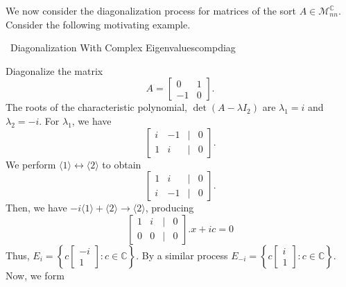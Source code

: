         We now consider the diagonalization process for matrices of the sort \(A\in\mathcal{M}_{nn}^\mathbb{C}\). Consider the following motivating example.
        \begin{example}{\Difficulty\,\Difficulty\,\,Diagonalization With Complex Eigenvalues}{compdiag}

            Diagonalize the matrix
            \begin{equation*}
                A=\begin{bmatrix}
                    0 & 1 \\
                     -1 & 0
                \end{bmatrix}.
            \end{equation*}
            The roots of the characteristic polynomial, \(\det(A-\lambda I_2)\) are \(\lambda_1=i\) and \(\lambda_2=-i\). For \(\lambda_1\), we have
            \begin{equation*}
                \begin{bmatrix}
                    i & -1 & | & 0 \\
                    1 & i & | & 0
                \end{bmatrix}.
            \end{equation*}
            We perform \(\langle1\rangle\leftrightarrow\langle2\rangle\) to obtain
            \begin{equation*}
                \begin{bmatrix}
                    1 & i & | & 0 \\
                    i & -1 & | & 0
                \end{bmatrix}.
            \end{equation*}
            Then, we have \(-i\langle1\rangle+\langle2\rangle\to\langle2\rangle\), producing
            \begin{equation*}
                \begin{bmatrix}
                    1 & i & | & 0 \\
                    0 & 0 & | & 0
                \end{bmatrix}. x+ic=0
            \end{equation*}
            Thus, \(E_i=\left\{c\begin{bmatrix} -i \\ 1 \end{bmatrix}:c\in\mathbb{C}\right\}\). By a similar process \(E_{-i}=\left\{c\begin{bmatrix} i \\ 1\end{bmatrix}:c\in\mathbb{C}\right\}\). Now, we form

\end{example}
